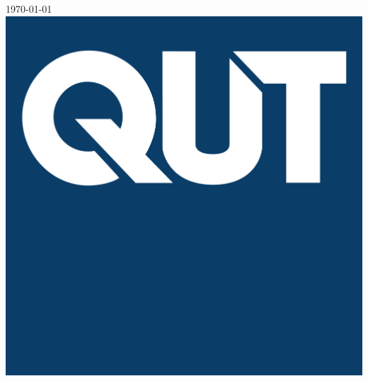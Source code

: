 \documentclass[12pt]{article}
\begin{document}
\begin{titlepage}

{\large \today}\\[2cm] %


\includegraphics[scale=0.10]{qut-logo-better}\\[2cm] %
 


\end{titlepage}



\tableofcontents
\newpage
\end{document}
